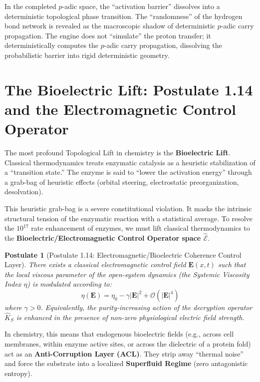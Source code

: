 \documentclass[11pt,openany]{extbook}
\theoremstyle{plain}
\newtheorem{postulate}{Postulate}[chapter]
\theoremstyle{definition}
\begin{document}
In the completed $p$-adic space, the ``activation barrier'' dissolves into a deterministic topological phase transition. The ``randomness'' of the hydrogen bond network is revealed as the macroscopic shadow of deterministic $p$-adic carry propagation. The engine does not ``simulate'' the proton transfer; it deterministically computes the $p$-adic carry propagation, dissolving the probabilistic barrier into rigid deterministic geometry.

\section{The Bioelectric Lift: Postulate 1.14 and the Electromagnetic Control Operator}

The most profound Topological Lift in chemistry is the \textbf{Bioelectric Lift}. Classical thermodynamics treats enzymatic catalysis as a heuristic stabilization of a ``transition state.'' The enzyme is said to ``lower the activation energy'' through a grab-bag of heuristic effects (orbital steering, electrostatic preorganization, desolvation).

This heuristic grab-bag is a severe constitutional violation. It masks the intrinsic structural tension of the enzymatic reaction with a statistical average. To resolve the $10^{17}$ rate enhancement of enzymes, we must lift classical thermodynamics to the \textbf{Bioelectric/Electromagnetic Control Operator space $\hat{\mathcal{E}}$}.

\begin{postulate}[Postulate 1.14: Electromagnetic/Bioelectric Coherence Control Layer]
There exists a classical electromagnetic control field $\mathbf{E}(x,t)$ such that the local viscous parameter of the open-system dynamics (the Systemic Viscosity Index $\eta$) is modulated according to:
\[
\eta(\mathbf{E}) = \eta_0 - \gamma|\mathbf{E}|^2 + \mathcal{O}(|\mathbf{E}|^4)
\]
where $\gamma > 0$. Equivalently, the purity-increasing action of the decryption operator $\hat{K}_S$ is enhanced in the presence of non-zero physiological electric field strength.
\end{postulate}

In chemistry, this means that endogenous bioelectric fields (e.g., across cell membranes, within enzyme active sites, or across the dielectric of a protein fold) act as an \textbf{Anti-Corruption Layer (ACL)}. They strip away ``thermal noise'' and force the substrate into a localized \textbf{Superfluid Regime} (zero antagonistic entropy).
\end{document}
